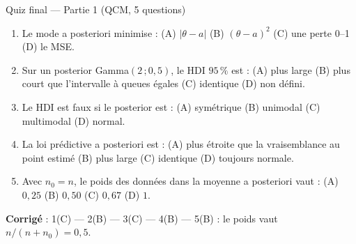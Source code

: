 \begin{frame}{Quiz final --- Partie 1 (QCM, 5 questions)}
\begin{qbox}
\begin{enumerate}
  \item Le mode a posteriori minimise : \; (A) $|\theta-a|$ \; (B) $(\theta-a)^2$
        \; (C) une perte 0--1 \; (D) le MSE.
  \item Sur un posterior Gamma$(2\,;0{,}5)$, le HDI $95\,\%$ est :
        \; (A) plus large \; (B) plus court que l'intervalle à queues égales
        \; (C) identique \; (D) non défini.
  \item Le HDI est faux si le posterior est : \; (A) symétrique \; (B) unimodal
        \; (C) multimodal \; (D) normal.
  \item La loi prédictive a posteriori est : \; (A) plus étroite que la
        vraisemblance au point estimé \; (B) plus large \; (C) identique
        \; (D) toujours normale.
  \item Avec $n_0 = n$, le poids des données dans la moyenne a posteriori
        vaut : \; (A) $0{,}25$ \; (B) $0{,}50$ \; (C) $0{,}67$ \; (D) $1$.
\end{enumerate}
\vspace{1mm}
\textbf{Corrigé} : 1(C) --- 2(B) --- 3(C) --- 4(B) --- 5(B) : le poids vaut
$n/(n+n_0) = 0{,}5$.
\end{qbox}
\end{frame}

